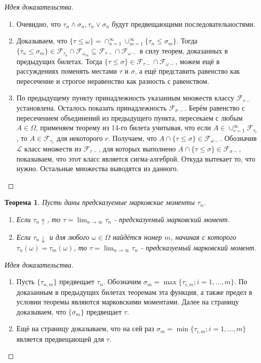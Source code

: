 \documentclass[16pt]{article}
\newtheorem{theorem}{Теорема}[section]
\theoremstyle{definition}
\begin{document}
\begin{proof}[Идея доказательства]
\begin{enumerate}
    \item Очевидно, что $\tau_n \wedge \sigma_n, \tau_n \vee \sigma_n$ будут предвещающими последовательностями.
    \item Доказываем, что $\{\tau \le \omega\} = \cap_{n = 1}^\infty \cup_{m = 1}^\infty \{\tau_n \le \sigma_m\}$. Тогда $\{\tau_n \le \sigma_m\} \in \mathcal{F}_{\tau_n} \cap \mathcal{F}_{\omega_m} \subseteq \mathcal{F}_{\tau-} \cap \mathcal{F}_{\omega-}$ в силу теорем, доказанных в предыдущих билетах. Тогда $\{\tau \le \sigma\} \in \mathcal{F}_{\tau-} \cap \mathcal{F}_{\omega-}$, можем ещё в рассуждениях поменять местами $\tau$ и $\sigma$, а ещё представить равенство как пересечение и строгое неравенство как разность с равенством.
    \item По предыдущему пункту принадлежность указанным множеств классу $\mathcal{F}_{\tau-}$ установлена. Осталось показать принадлежность $\mathcal{F}_{\sigma-}$. Берём равенство с пересечением объединений из предыдущего пункта, пересекаем с любым $A \in \Omega$, применяем теорему из 14-го билета учитывая, что если $A \in \cup_{r = 1}^\infty \mathcal{F}_{\tau_r}$, то $A \in \mathcal{F}_{\tau_r}$ для некоторого $r$. Получаем, что $A \cap \{\tau \le \sigma\} \in \mathcal{F}_{\sigma-}$. Обозначив $\mathcal{L}$ класс множеств из $\mathcal{F}_{\tau-}$, для которых выполнено $A \cap \{\tau \le \sigma\} \in \mathcal{F}_{\sigma-}$, показываем, что этот класс является сигма-алгеброй. Откуда вытекает то, что нужно. Остальные множества выводятся из данного.
\end{enumerate}
\end{proof}
\begin{theorem}
Пусть даны предсказуемые марковские моменты $\tau_n$.
\begin{enumerate}
    \item Если $\tau_n \uparrow$, то $\tau = \lim_{n \rightarrow \infty}\tau_n$ - предсказуемый марковский момент.
    \item Если $\tau_n \downarrow$ и для любого $\omega \in \Omega$ найдётся номер $m$, начиная с которого $\tau_n(\omega) = \tau_m(\omega)$, то $\tau = \lim_{n \rightarrow \infty}\tau_n$ - предсказуемый марковский момент.
\end{enumerate}
\end{theorem}
\begin{proof}[Идея доказательства]
\begin{enumerate}
    \item Пусть $\{\tau_{n,m}\}$ предвещает $\tau_n$. Обозначим $\sigma_m = \max\{\tau_{i, m}; i = 1,\ldots, m\}$. По доказанным в предыдущих билетах теоремам эта функция, а также предел в условии теоремы являются марковскими моментами. Далее на страницу доказываем, что $\{\sigma_m\}$ предвещает $\tau$.
    \item Ещё на страницу доказываем, что на сей раз $\sigma_m = \min\{\tau_{i, m}; i = 1, \ldots, m\}$ является предвещающей для $\tau$.
\end{enumerate}
\end{proof}
\end{document}

